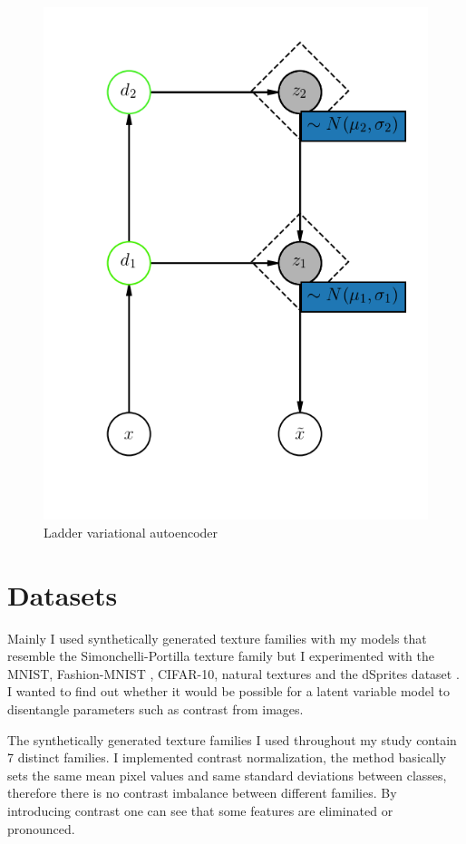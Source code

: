 \documentclass[12pt, english]{article}
\begin{document}
\vspace{4mm}

\begin{figure}[H]
    \centering
    \includegraphics[width=0.35\linewidth]{lvae.png}
    \caption{Ladder variational autoencoder}
\end{figure}

\newpage

\section{Datasets}

\vspace{7mm}

\par Mainly I used synthetically generated texture families with my models that resemble the Simonchelli-Portilla texture family \cite{portilla2003image} but I experimented with the MNIST, Fashion-MNIST \cite{xiao2017fashion}, CIFAR-10, natural textures and the dSprites dataset \cite{matthey2017dsprites}. I wanted to find out whether it would be possible for a latent variable model to disentangle parameters such as contrast from images.

\vspace{4mm}

\par The synthetically generated texture families I used throughout my study contain 7 distinct families. I implemented contrast normalization, the method basically sets the same mean pixel values and same standard deviations between classes, therefore there is no contrast imbalance between different families. By introducing contrast one can see that some features are eliminated or pronounced.

\vspace{4mm}
\end{document}
